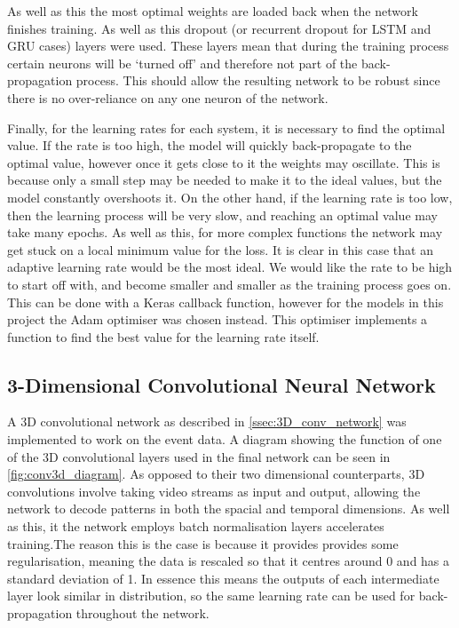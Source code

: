 As well as this the most optimal weights are loaded back when the network finishes training. As well as this dropout (or recurrent dropout for LSTM and GRU cases) layers were used. These layers mean that during the training process certain neurons will be `turned off' and therefore not part of the back-propagation process. This should allow the resulting network to be robust since there is no over-reliance on any one neuron of the network.

Finally, for the learning rates for each system, it is necessary to find the optimal value. If the rate is too high, the model will quickly back-propagate to the optimal value, however once it gets close to it the weights may oscillate. This is because only a small step may be needed to make it to the ideal values, but the model constantly overshoots it. On the other hand, if the learning rate is too low, then the learning process will be very slow, and reaching an optimal value may take many epochs. As well as this, for more complex functions the network may get stuck on a local minimum value for the loss. It is clear in this case that an adaptive learning rate would be the most ideal. We would like the rate to be high to start off with, and become smaller and smaller as the training process goes on. This can be done with a Keras callback function, however for the models in this project the Adam optimiser\cite{Adam} was chosen instead. This optimiser implements a function to find the best value for the learning rate itself.

\subsection{3-Dimensional Convolutional Neural Network} \label{ssec:conv_3d_network_design}

A 3D convolutional network as described in \cref{ssec:3D_conv_network} was implemented to work on the event data. A diagram showing the function of one of the 3D convolutional layers used in the final network can be seen in \cref{fig:conv3d_diagram}. As opposed to their two dimensional counterparts, 3D convolutions involve taking video streams as input and output, allowing the network to decode patterns in both the spacial and temporal dimensions. As well as this, it the network employs batch normalisation layers accelerates training.The reason this is the case is because it provides provides some regularisation, meaning the data is rescaled so that it centres around 0 and has a standard deviation of 1. In essence this means the outputs of each intermediate layer look similar in distribution, so the same learning rate can be used for back-propagation throughout the network.

